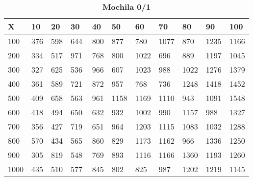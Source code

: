 \documentclass[10pt,letterpaper]{article}
\begin{document}
\newpage 
{}
\begin{center}
\begin{table}\renewcommand{\arraystretch}{2.5}
\caption{\large \textbf{Mochila 0/1}}
\centering
\begin{tabular} { |m{0.5cm}|m{1.3cm}|m{1.3cm}|m{1.3cm}|m{1.3cm}|m{1.3cm}|m{1.3cm}|m{1.3cm}|m{1.3cm}|m{1.3cm}|m{1.3cm}|} 
\hline
\rowcolor{Gray}
\centering \textbf{X} & \centering \textbf{10} & \centering \textbf{20} & \centering \textbf{30}\ & \centering \textbf{40} & \centering \textbf{50} & \centering \textbf{60}\ & \centering \textbf{70} & \centering \textbf{80} & \centering \textbf{90}\ & \textbf{100} \\\hline
\cellcolor{Gray}100 & \Large 376 & \Large 598 & \Large 644 & \Large 800 & \Large 877 & \Large 780 & \Large 1077 & \Large 870 & \Large 1235 & \Large 1166 \\
\hline
\cellcolor{Gray}200 & \Large 334 & \Large 517 & \Large 971 & \Large 768 & \Large 800 & \Large 1022 & \Large 696 & \Large 889 & \Large 1197 & \Large 1045 \\
\hline
\cellcolor{Gray}300 & \Large 327 & \Large 625 & \Large 536 & \Large 966 & \Large 607 & \Large 1023 & \Large 988 & \Large 1022 & \Large 1276 & \Large 1379 \\
\hline
\cellcolor{Gray}400 & \Large 361 & \Large 589 & \Large 721 & \Large 872 & \Large 957 & \Large 768 & \Large 736 & \Large 1248 & \Large 1418 & \Large 1452 \\
\hline
\cellcolor{Gray}500 & \Large 409 & \Large 658 & \Large 563 & \Large 961 & \Large 1158 & \Large 1169 & \Large 1110 & \Large 943 & \Large 1091 & \Large 1548 \\
\hline
\cellcolor{Gray}600 & \Large 418 & \Large 494 & \Large 650 & \Large 632 & \Large 932 & \Large 1002 & \Large 990 & \Large 1157 & \Large 988 & \Large 1327 \\
\hline
\cellcolor{Gray}700 & \Large 356 & \Large 427 & \Large 719 & \Large 651 & \Large 964 & \Large 1203 & \Large 1115 & \Large 1083 & \Large 1032 & \Large 1288 \\
\hline
\cellcolor{Gray}800 & \Large 570 & \Large 434 & \Large 565 & \Large 860 & \Large 829 & \Large 1173 & \Large 1162 & \Large 966 & \Large 1336 & \Large 1250 \\
\hline
\cellcolor{Gray}900 & \Large 305 & \Large 819 & \Large 548 & \Large 769 & \Large 893 & \Large 1116 & \Large 1166 & \Large 1360 & \Large 1193 & \Large 1260 \\
\hline
\cellcolor{Gray}1000 & \Large 435 & \Large 510 & \Large 577 & \Large 845 & \Large 802 & \Large 825 & \Large 987 & \Large 1202 & \Large 1219 & \Large 1145 \\
\hline
\end{tabular} \\
\end{table}
\end{center}
\end{document}
